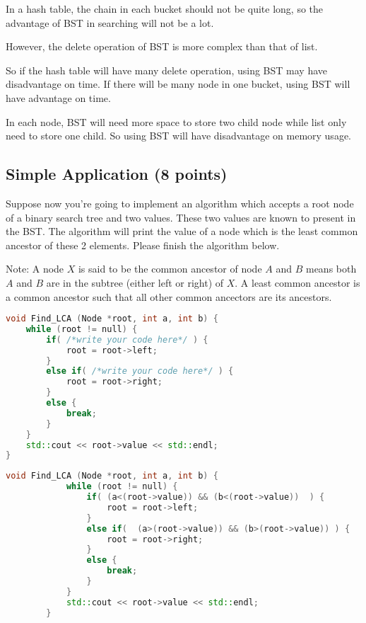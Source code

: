 \documentclass[11pt]{exam}
\begin{document}
\begin{solution}
    In a hash table, the chain in each bucket should not be quite long, so the advantage of BST in searching will not be a lot.

    However, the delete operation of BST is more complex than that of list.

    So if the hash table will have many delete operation, using BST may have disadvantage on time. If there will be many node in one bucket, using BST will have advantage on time.

    In each node, BST will need more space to store two child node while list only need to store one child. So using BST will have disadvantage on memory usage.
\end{solution}

\subsection{Simple Application (8 points)}
Suppose now you're going to implement an algorithm which accepts a root node of a binary search tree and two values. These two values are known to present in the BST. The algorithm will print the value of a node which is the least common ancestor of these 2 elements. Please finish the algorithm below.

Note: A node $X$ is said to be the common ancestor of node $A$ and $B$ means both $A$ and $B$ are in the subtree (either left or right) of $X$. A least common ancestor is a common ancestor such that all other common ancectors are its ancestors.
\begin{lstlisting}[language=c++]
void Find_LCA (Node *root, int a, int b) {
    while (root != null) {
        if( /*write your code here*/ ) {
            root = root->left;
        }
        else if( /*write your code here*/ ) {
            root = root->right;
        }
        else {
            break;
        }
    }
    std::cout << root->value << std::endl; 
}
\end{lstlisting}

\begin{solution}
    \begin{lstlisting}[language=c++]
        void Find_LCA (Node *root, int a, int b) {
            while (root != null) {
                if( (a<(root->value)) && (b<(root->value))  ) {
                    root = root->left;
                }
                else if(  (a>(root->value)) && (b>(root->value)) ) {
                    root = root->right;
                }
                else {
                    break;
                }
            }
            std::cout << root->value << std::endl; 
        }
        \end{lstlisting}\end{solution}
\end{document}
